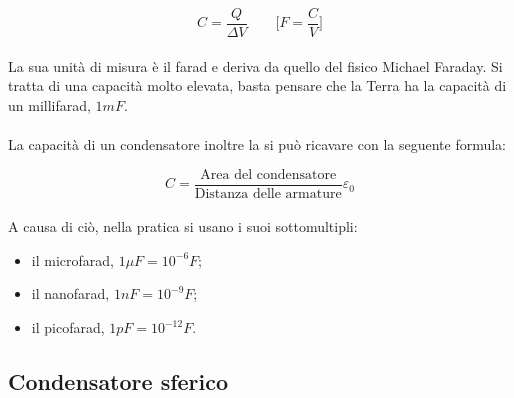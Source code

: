\begin{equation}
    C = \frac{Q}{\Delta V} \qquad \biggl[F = \frac{C}{V}\biggl]
\end{equation}

\paragraph{}
La sua unità di misura è il farad e deriva da quello del fisico Michael Faraday.
Si tratta di una capacità molto elevata, basta pensare che la Terra ha la capacità di un millifarad, $1 mF$. 

\paragraph{}
La capacità di un condensatore inoltre la si può ricavare con la seguente formula:

\begin{equation}
    C = \frac{\text{Area del condensatore}}{\text{Distanza delle armature}} \varepsilon_0
\end{equation}

\paragraph{}
A causa di ciò, nella pratica si usano i suoi sottomultipli: 

\newpage
\begin{itemize}
    \item il microfarad, $1 \mu F = 10^{-6} F$;
    \item il nanofarad, $1 nF=10^{-9} F$;
    \item il picofarad, $1 pF=10^{-12} F$.
\end{itemize}  


\subsection{Condensatore sferico}

